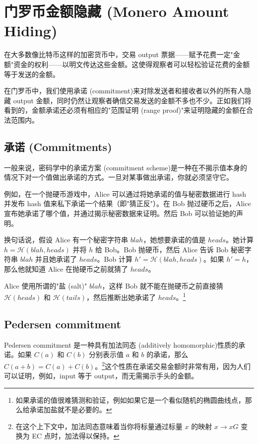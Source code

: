 \chapter{门罗币金额隐藏 (Monero Amount Hiding)}
\label{chapter:pedersen-commitments}

在大多数像比特币这样的加密货币中，交易 output 票据——赋予花费一定"金额"资金的权利——以明文传达这些金额。这使得观察者可以轻松验证花费的金额等于发送的金额。

在门罗币中，我们使用{承诺 (commitment)}来对除发送者和接收者以外的所有人隐藏 output 金额，同时仍然让观察者确信交易发送的金额不多也不少。正如我们将看到的，金额承诺还必须有相应的"范围证明 (range proof)"来证明隐藏的金额在合法范围内。



\section{承诺 (Commitments)}
\label{sec:commitments}

一般来说，密码学中的{承诺方案 (commitment scheme)}是一种在不揭示值本身的情况下对一个值做出承诺的方式。一旦对某事做出承诺，你就必须坚守它。

例如，在一个抛硬币游戏中，Alice 可以通过将她承诺的值与秘密数据进行 hash 并发布 hash 值来私下承诺一个结果（即"猜正反"）。在 Bob 抛过硬币之后，Alice 宣布她承诺了哪个值，并通过揭示秘密数据来证明。然后 Bob 可以验证她的声明。

换句话说，假设 Alice 有一个秘密字符串 $blah$，她想要承诺的值是 $heads$。她计算 $h = \mathcal{H}(blah, heads)$ 并将 $h$ 给 Bob。Bob 抛硬币，然后 Alice 告诉 Bob 秘密字符串 $blah$ 并且她承诺了 $heads$。Bob 计算 $h' = \mathcal{H}(blah, heads)$。如果 $h' = h$，那么他就知道 Alice 在抛硬币之前就猜了 $heads$。

Alice 使用所谓的"盐 (salt)" $blah$，这样 Bob 就不能在抛硬币之前直接猜 $\mathcal{H}(heads)$ 和 $\mathcal{H}(tails)$，然后推断出她承诺了 $heads$。\footnote{如果承诺的值很难猜测和验证，例如如果它是一个看似随机的椭圆曲线点，那么给承诺加盐就不是必要的。}


\section{Pedersen commitment}
\label{pedersen_section}

{Pedersen commitment} \cite{Pedersen1992} 是一种具有{加法同态 (additively homomorphic)}性质的承诺。如果 \(C(a)\) 和 \(C(b)\) 分别表示值 \(a\) 和 \(b\) 的承诺，那么 \(C(a + b) = C(a) + C(b)\)。\footnote{在这个上下文中，加法同态意味着当你将标量通过标量 $x$ 的映射 $x \rightarrow x G$ 变换为 EC 点时，加法得以保持。}这个性质在承诺交易金额时非常有用，因为人们可以证明，例如，input 等于 output，而无需揭示手头的金额。\\


